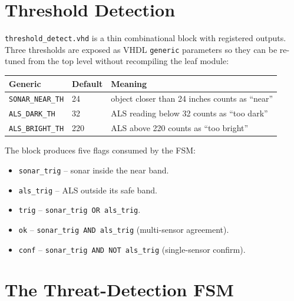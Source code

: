 \documentclass[11pt,a4paper]{article}
\begin{document}
\section{Threshold Detection}

\texttt{threshold\_detect.vhd} is a thin combinational block with
registered outputs.  Three thresholds are exposed as VHDL \texttt{generic}
parameters so they can be re-tuned from the top level without recompiling
the leaf module:

\begin{table}[h]
\centering
\begin{tabular}{@{}lll@{}}
\toprule
Generic & Default & Meaning \\ \midrule
\texttt{SONAR\_NEAR\_TH} & 24 & object closer than 24 inches counts as ``near'' \\
\texttt{ALS\_DARK\_TH}   & 32 & ALS reading below 32 counts as ``too dark'' \\
\texttt{ALS\_BRIGHT\_TH} & 220 & ALS above 220 counts as ``too bright'' \\
\bottomrule
\end{tabular}
\end{table}

The block produces five flags consumed by the FSM:

\begin{itemize}
  \item \texttt{sonar\_trig} -- sonar inside the near band.
  \item \texttt{als\_trig}   -- ALS outside its safe band.
  \item \texttt{trig}        -- \texttt{sonar\_trig OR als\_trig}.
  \item \texttt{ok}          -- \texttt{sonar\_trig AND als\_trig} (multi-sensor agreement).
  \item \texttt{conf}        -- \texttt{sonar\_trig AND NOT als\_trig} (single-sensor confirm).
\end{itemize}

\section{The Threat-Detection FSM}
\end{document}
